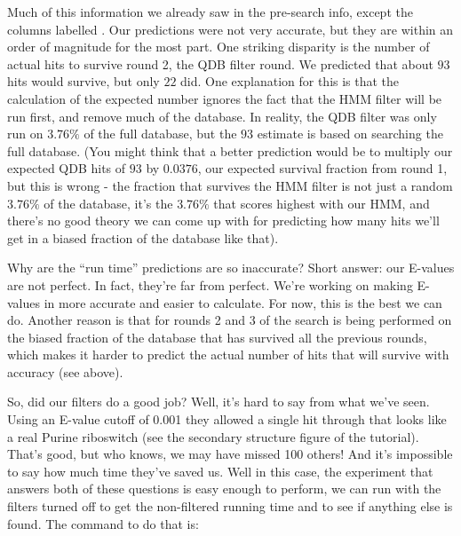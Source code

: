 Much of this information we already saw in the pre-search info, except
the columns labelled . Our predictions were not very
accurate, but they are within an order of magnitude for the most
part. One striking disparity is the number of actual hits to survive
round 2, the QDB filter round. We predicted that about $93$ hits
would survive, but only $22$ did. One explanation for this is
that the calculation of the expected number ignores the fact that the
HMM filter will be run first, and remove much of the database. In
reality, the QDB filter was only run on $3.76\%$ of the full
database, but the $93$ estimate is based on searching the full
database. (You might think that a better prediction would be to 
multiply our expected QDB hits of $93$ by $0.0376$, our expected
survival fraction from round 1, but this is wrong - the fraction that
survives the HMM filter is not just a random $3.76\%$ of the database,
it's the $3.76\%$ that scores highest with our HMM, and there's no good
theory we can come up with for predicting how many hits we'll get in a
biased fraction of the database like that).

\begin{srefaq}{Why are the  ``run time'' predictions are
  so inaccurate?} Short answer: our E-values are not perfect. In fact,
  they're far from perfect. We're working on making E-values in
   more accurate and easier to calculate. For now,
  this is the best we can do. Another reason is that for rounds 2 and
  3 of  the search is being performed on the biased
  fraction of the database that has survived all the previous rounds,
  which makes it harder to predict the actual number of hits that will
  survive with accuracy (see above).
\end{srefaq}

So, did our filters do a good job? Well, it's hard to say from what
we've seen. Using an E-value cutoff of 0.001 they allowed a single hit
through that looks like a real Purine riboswitch (see the secondary
structure figure of the tutorial). That's good, but who knows, we may
have missed 100 others!  And it's impossible to say how much time
they've saved us. Well in this case, the experiment that answers both
of these questions is easy enough to perform, we can run
 with the filters turned off 
to get the non-filtered running time and to see if anything else
is found. The command to do that is: 

\\

